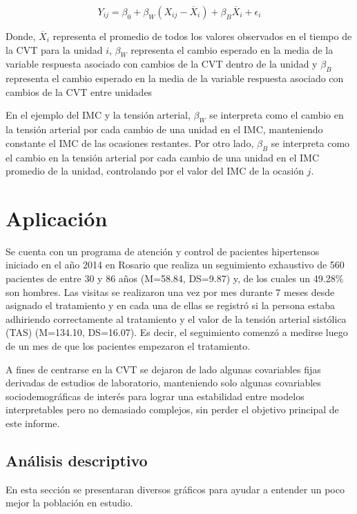 \documentclass[spanish]{article}
\numberwithin{figure}{subsection}
\numberwithin{equation}{subsection}
\numberwithin{table}{subsection}
\def\npatients{560}
\begin{document}
\[ Y_{ij} = \beta_0 + \beta_W (X_{ij} - \overline{X}_i) + \beta_B \overline{X}_i + \epsilon_{i} \]

Donde, $\overline{X}_i$ representa el promedio de todos los valores observados
en el tiempo de la CVT para la unidad $i$, $\beta_W$ representa el cambio
esperado en la media de la variable respuesta asociado con cambios de la CVT
dentro de la unidad y $\beta_B$ representa el cambio esperado en la media de
la variable respuesta asociado con cambios de la CVT entre unidades

En el ejemplo del IMC y la tensión arterial, $\beta_W$ se interpreta como el
cambio en la tensión arterial por cada cambio de una unidad en el IMC,
manteniendo constante el IMC de las ocasiones restantes. Por otro lado,
$\beta_B$ se interpreta como el cambio en la tensión arterial por cada cambio de
una unidad en el IMC promedio de la unidad, controlando por el valor del IMC de
la ocasión $j$.

\newpage

\section{Aplicación}

Se cuenta con un programa de atención y control de pacientes hipertensos
iniciado en el año 2014 en Rosario que realiza un seguimiento exhaustivo de
\npatients{} pacientes de entre 30 y 86 años (M=58.84, DS=9.87) y, de los cuales
un 49.28\% son hombres. Las visitas se realizaron una vez por mes durante 7
meses desde asignado el tratamiento y en cada una de ellas se registró si la
persona estaba adhiriendo correctamente al tratamiento y el valor de la tensión
arterial sistólica (TAS) (M=134.10, DS=16.07). Es decir, el seguimiento comenzó
a medirse luego de un mes de que los pacientes empezaron el tratamiento.

A fines de centrarse en la CVT se dejaron de lado algunas covariables fijas
derivadas de estudios de laboratorio, manteniendo solo algunas covariables
sociodemográficas de interés para lograr una estabilidad entre modelos
interpretables pero no demasiado complejos, sin perder el objetivo principal de
este informe.

\subsection{Análisis descriptivo}

En esta sección se presentaran diversos gráficos para ayudar a entender un poco
mejor la población en estudio.
\end{document}
